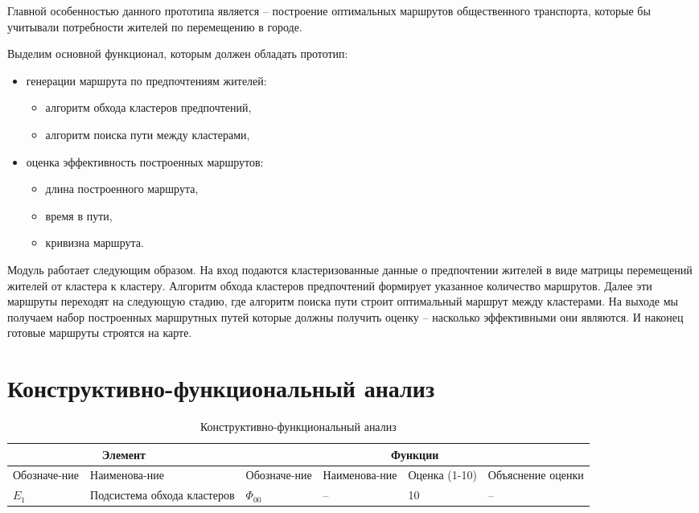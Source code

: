 Главной особенностью данного прототипа является -- построение оптимальных маршрутов общественного 
транспорта, которые бы учитывали потребности жителей по перемещению в городе. 

Выделим основной функционал, которым должен обладать прототип:
\begin{itemize}
    \item генерации маршрута по предпочтениям жителей:
    \begin{itemize}
        \item алгоритм обхода кластеров предпочтений,
        \item алгоритм поиска пути между кластерами,
    \end{itemize}
    \item оценка эффективность построенных маршрутов:
    \begin{itemize}
        \item длина построенного маршрута,
        \item время в пути,
        \item кривизна маршрута.
    \end{itemize}
\end{itemize}

Модуль работает следующим образом. На вход подаются кластеризованные данные о предпочтении жителей в виде 
матрицы перемещений жителей от кластера к кластеру. Алгоритм обхода кластеров предпочтений формирует 
указанное количество маршрутов. Далее эти маршруты переходят на следующую стадию, где алгоритм поиска 
пути строит оптимальный маршрут между кластерами. На выходе мы получаем набор построенных маршрутных 
путей которые должны получить оценку -- насколько эффективными они являются. И наконец готовые маршруты 
строятся на карте.

\chapter{Конструктивно-функциональный анализ}

\begin{table}[h]
    \center
    \caption{Конструктивно-функциональный анализ}
    \begin{tabularx}{\textwidth}{|X|X|X|X|X|X|}
        \hline
        \multicolumn{2}{|c|}{Элемент} & \multicolumn{4}{|c|}{Функции} \\ \hline
        Обозначе-ние & Наименова-ние & Обозначе-ние & Наименова-ние & Оценка (1-10) & Объяснение оценки \\ \hline
        \( E_1 \) & Подсистема обхода кластеров & \( \Phi_{00} \) & -- & 10 & -- \\ \hline
    \end{tabularx}
\end{table}

